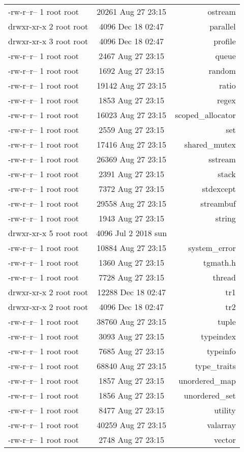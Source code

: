 \documentclass[10pt]{article}
\begin{document}
\begin{tabular}{|l|c|r|}
    -rw-r--r-- 1 root root & 20261 Aug 27 23:15 & ostream\\
    drwxr-xr-x 2 root root &  4096 Dec 18 02:47 & parallel\\
    drwxr-xr-x 3 root root &  4096 Dec 18 02:47 & profile\\
    -rw-r--r-- 1 root root &  2467 Aug 27 23:15 & queue\\
    -rw-r--r-- 1 root root &  1692 Aug 27 23:15 & random\\
    -rw-r--r-- 1 root root & 19142 Aug 27 23:15 & ratio\\
    -rw-r--r-- 1 root root &  1853 Aug 27 23:15 & regex\\
    -rw-r--r-- 1 root root & 16023 Aug 27 23:15 & scoped\_allocator\\
    -rw-r--r-- 1 root root &  2559 Aug 27 23:15 & set\\
    -rw-r--r-- 1 root root & 17416 Aug 27 23:15 & shared\_mutex\\
    -rw-r--r-- 1 root root & 26369 Aug 27 23:15 & sstream\\
    -rw-r--r-- 1 root root &  2391 Aug 27 23:15 & stack\\
    -rw-r--r-- 1 root root &  7372 Aug 27 23:15 & stdexcept\\
    -rw-r--r-- 1 root root & 29558 Aug 27 23:15 & streambuf\\
    -rw-r--r-- 1 root root &  1943 Aug 27 23:15 & string\\
    drwxr-xr-x 5 root root &  4096 Jul  2  2018 sun\\
    -rw-r--r-- 1 root root & 10884 Aug 27 23:15 & system\_error\\
    -rw-r--r-- 1 root root &  1360 Aug 27 23:15 & tgmath.h\\
    -rw-r--r-- 1 root root &  7728 Aug 27 23:15 & thread\\
    drwxr-xr-x 2 root root & 12288 Dec 18 02:47 & tr1\\
    drwxr-xr-x 2 root root &  4096 Dec 18 02:47 & tr2\\
    -rw-r--r-- 1 root root & 38760 Aug 27 23:15 & tuple\\
    -rw-r--r-- 1 root root &  3093 Aug 27 23:15 & typeindex\\
    -rw-r--r-- 1 root root &  7685 Aug 27 23:15 & typeinfo\\
    -rw-r--r-- 1 root root & 68840 Aug 27 23:15 & type\_traits\\
    -rw-r--r-- 1 root root &  1857 Aug 27 23:15 & unordered\_map\\
    -rw-r--r-- 1 root root &  1856 Aug 27 23:15 & unordered\_set\\
    -rw-r--r-- 1 root root &  8477 Aug 27 23:15 & utility\\
    -rw-r--r-- 1 root root & 40259 Aug 27 23:15 & valarray\\
    -rw-r--r-- 1 root root &  2748 Aug 27 23:15 & vector\\
  \end{tabular}
\end{document}
